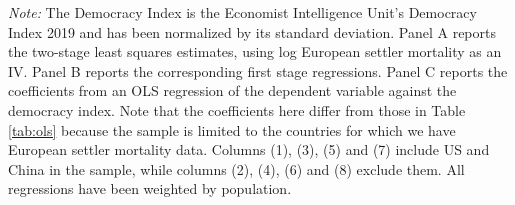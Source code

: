 \begin{landscape}
\begin{table}[!htbp]
\begin{threeparttable}
\begin{tablenotes}
\item {\footnotesize {\textit{Note:} The Democracy Index is the Economist Intelligence Unit's Democracy Index 2019 and has been normalized by its standard deviation. Panel A reports the two-stage least squares estimates, using log European settler mortality as an IV. Panel B reports the corresponding first stage regressions. Panel C reports the coefficients from an OLS regression of the dependent variable against the democracy index. Note that the coefficients here differ from those in Table \ref{tab:ols} because the sample is limited to the countries for which we have European settler mortality data. Columns (1), (3), (5) and (7) include US and China in the sample, while columns (2), (4), (6) and (8) exclude them. All regressions have been weighted by population.}}
\end{tablenotes}
\end{threeparttable}

\end{table} 
\end{landscape}



